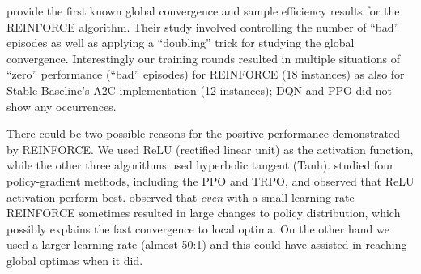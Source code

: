 \documentclass[a4paper, 12pt]{article}
\begin{document}
\cite{zhang2021sample} provide the first known global convergence and sample efficiency results for the REINFORCE algorithm. Their study involved controlling the number of ``bad'' episodes as well as applying a ``doubling'' trick for studying the global convergence. Interestingly our training rounds resulted in multiple situations of ``zero'' performance (``bad'' episodes) for REINFORCE (18 instances) as also for Stable-Baseline's A2C implementation (12 instances); DQN and PPO did not show any occurrences. %

There could be two possible reasons for the positive performance demonstrated by REINFORCE. We used ReLU (rectified linear unit) as the activation function, while the other three algorithms used hyperbolic tangent (Tanh). \cite{henderson2018deep} studied four policy-gradient methods, including the PPO and TRPO, and observed that ReLU activation perform best. \cite{duan2016benchmarking} observed that \textit{even} with a small learning rate REINFORCE sometimes resulted in large changes to policy distribution, which possibly explains the fast convergence to local optima. On the other hand we used a larger learning rate (almost 50:1) and this could have assisted in reaching global optimas when it did. %
\end{document}

